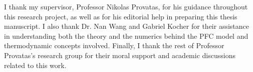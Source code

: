 
I thank my supervisor, Professor Nikolas Provatas, for his guidance throughout this research project, as well as for his editorial help in preparing this thesis manuscript. I also thank Dr. Nan Wang and Gabriel Kocher for their assistance in understanding both the theory and the numerics behind the PFC model and thermodynamic concepts involved. Finally, I thank the rest of Professor Provatas's research group for their moral support and academic discussions related to this work.